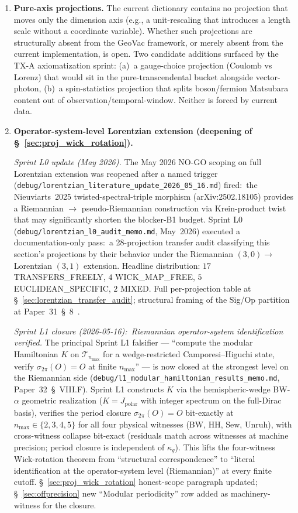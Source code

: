 \documentclass[11pt]{article}
\begin{document}
\begin{enumerate}
\item \textbf{Pure-axis projections.}  The current dictionary contains
no projection that moves only the dimension axis (e.g., a
unit-rescaling that introduces a length scale without a coordinate
variable).  Whether such projections are structurally absent from the
GeoVac framework, or merely absent from the current implementation,
is open.  Two candidate additions surfaced by the TX-A axiomatization
sprint: (a)~a gauge-choice projection (Coulomb vs Lorenz) that would
sit in the pure-transcendental bucket alongside vector-photon, (b)~a
spin-statistics projection that splits boson/fermion Matsubara
content out of observation/temporal-window.  Neither is forced by
current data.

\item \textbf{Operator-system-level Lorentzian extension (deepening
of \S~\ref{sec:proj_wick_rotation}).}

\medskip
\noindent\textit{Sprint L0 update (May 2026).}  The May 2026 NO-GO
scoping on full Lorentzian extension was reopened after a named
trigger (\texttt{debug/lorentzian\_literature\_update\_2026\_05\_16.md})
fired:\ the Nieuviarts~2025 twisted-spectral-triple morphism
(arXiv:2502.18105) provides a Riemannian $\to$ pseudo-Riemannian
construction via Krein-product twist that may significantly shorten
the blocker-B1 budget.  Sprint L0
(\texttt{debug/lorentzian\_l0\_audit\_memo.md}, May~2026) executed a
documentation-only pass:\ a 28-projection transfer audit classifying
this section's projections by their behavior under the
Riemannian $(3, 0) \to$ Lorentzian $(3, 1)$ extension.  Headline
distribution: $17$ TRANSFERS\_FREELY, $4$ WICK\_MAP\_FREE,
$5$ EUCLIDEAN\_SPECIFIC, $2$ MIXED.  Full per-projection table at
\S~\ref{sec:lorentzian_transfer_audit}; structural framing of the
Sig/Op partition at Paper~31~\S~8~\cite{paper31}.

\medskip
\noindent\textit{Sprint L1 closure (2026-05-16):\ Riemannian
operator-system identification verified.}  The principal Sprint L1
falsifier --- ``compute the modular Hamiltonian $K$ on
$\mathcal{T}_{n_{\max}}$ for a wedge-restricted Camporesi--Higuchi
state, verify $\sigma_{2\pi}(O) = O$ at finite $n_{\max}$'' ---
is now closed at the strongest level on the Riemannian side
(\texttt{debug/l1\_modular\_hamiltonian\_results\_memo.md},
Paper~32~\S~VIII.F).  Sprint L1 constructs $K$ via the
hemispheric-wedge BW-$\alpha$ geometric realization
($K = J_{\mathrm{polar}}$ with integer spectrum on the full-Dirac
basis), verifies the period closure $\sigma_{2\pi}(O) = O$ bit-exactly
at $n_{\max} \in \{2, 3, 4, 5\}$ for all four physical witnesses (BW,
HH, Sew, Unruh), with cross-witness collapse bit-exact (residuals
match across witnesses at machine precision; period closure is
independent of $\kappa_g$).  This lifts the four-witness Wick-rotation
theorem from ``structural correspondence'' to ``literal identification
at the operator-system level (Riemannian)'' at every finite cutoff.
\S~\ref{sec:proj_wick_rotation} honest-scope paragraph updated;
\S~\ref{sec:offprecision} new ``Modular periodicity'' row added as
machinery-witness for the closure.


\end{enumerate}
\end{document}

